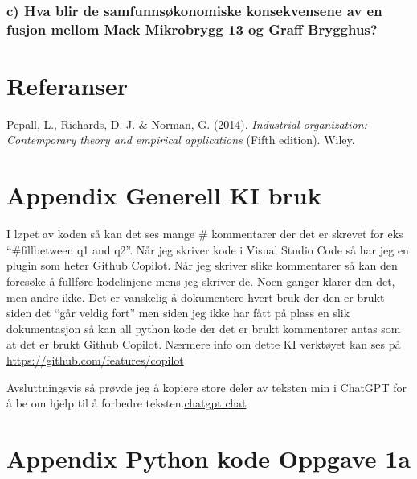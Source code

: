 \documentclass[
  12pt,
  a4paper,
  DIV=11,
  numbers=noendperiod]{scrartcl}
\newlength{\cslhangindent}
\newenvironment{CSLReferences}[2] %
 {\begin{list}{}{%
  \setlength{\itemindent}{0pt}
  \setlength{\leftmargin}{0pt}
  \setlength{\parsep}{0pt}
  \ifodd #1
   \setlength{\leftmargin}{\cslhangindent}
   \setlength{\itemindent}{-1\cslhangindent}
  \fi
  \setlength{\itemsep}{#2\baselineskip}}}
 {\end{list}}
\begin{document}
\subsubsection{c) Hva blir de samfunnsøkonomiske konsekvensene av en
fusjon mellom Mack Mikrobrygg 13 og Graff
Brygghus?}\label{c-hva-blir-de-samfunnsuxf8konomiske-konsekvensene-av-en-fusjon-mellom-mack-mikrobrygg-13-og-graff-brygghus}

\clearpage

\section{Referanser}\label{referanser}

\label{refs}
\begin{CSLReferences}{1}{0}
Pepall, L., Richards, D. J. \& Norman, G. (2014). \emph{Industrial
organization: Contemporary theory and empirical applications} (Fifth
edition). Wiley.

\end{CSLReferences}

\clearpage

\appendix

\section {Appendix Generell KI bruk}

I løpet av koden så kan det ses mange \# kommentarer der det er skrevet
for eks ``\#fillbetween q1 and q2''. Når jeg skriver kode i Visual
Studio Code så har jeg en plugin som heter Github Copilot. Når jeg
skriver slike kommentarer så kan den foresøke å fullføre kodelinjene
mens jeg skriver de. Noen ganger klarer den det, men andre ikke. Det er
vanskelig å dokumentere hvert bruk der den er brukt siden det ``går
veldig fort'' men siden jeg ikke har fått på plass en slik dokumentasjon
så kan all python kode der det er brukt kommentarer antas som at det er
brukt Github Copilot. Nærmere info om dette KI verktøyet kan ses på
\url{https://github.com/features/copilot}

Avsluttningsvis så prøvde jeg å kopiere store deler av teksten min i
ChatGPT for å be om hjelp til å forbedre
teksten.\href{https://chat.openai.com/share/a72be4bd-cbbc-4e7c-82d5-dc9c5241b74b}{chatgpt
chat}

\clearpage

\section {Appendix Python kode Oppgave 1a}
\end{document}

